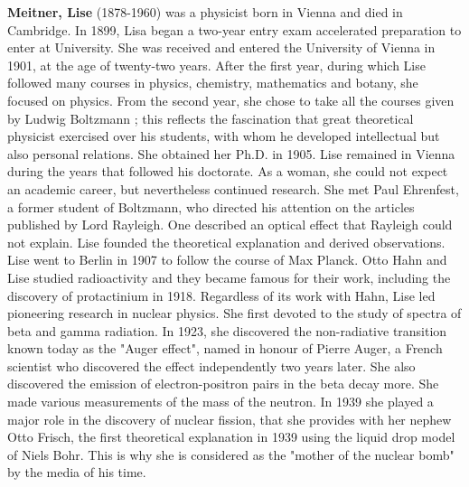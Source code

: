 \textbf{Meitner, Lise} (1878-1960) was a physicist born in Vienna and died in Cambridge. In 1899, Lisa began a two-year entry exam accelerated preparation to enter at University. She was received and entered the University of Vienna in 1901, at the age of twenty-two years. After the first year, during which Lise followed many courses in physics, chemistry, mathematics and botany, she focused on physics. From the second year, she chose to take all the courses given by Ludwig Boltzmann ; this reflects the fascination that great theoretical physicist exercised over his students, with whom he developed intellectual but also personal relations. She obtained her Ph.D. in 1905. Lise remained in Vienna during the years that followed his doctorate. As a woman, she could not expect an academic career, but nevertheless continued research. She met Paul Ehrenfest, a former student of Boltzmann, who directed his attention on the articles published by Lord Rayleigh. One described an optical effect that Rayleigh could not explain. Lise founded the theoretical explanation and derived observations. Lise went to Berlin in 1907 to follow the course of Max Planck. Otto Hahn and Lise studied radioactivity and they became famous for their work, including the discovery of protactinium in 1918. Regardless of its work with Hahn, Lise led pioneering research in nuclear physics. She first devoted to the study of spectra of beta and gamma radiation. In 1923, she discovered the non-radiative transition known today as the "Auger effect", named in honour of Pierre Auger, a French scientist who discovered the effect independently two years later. She also discovered the emission of electron-positron pairs in the beta decay more. She made various measurements of the mass of the neutron. In 1939 she played a major role in the discovery of nuclear fission, that she provides with her nephew Otto Frisch, the first theoretical explanation in 1939 using the liquid drop model of Niels Bohr. This is why she is considered as the "mother of the nuclear bomb" by the media of his time.

